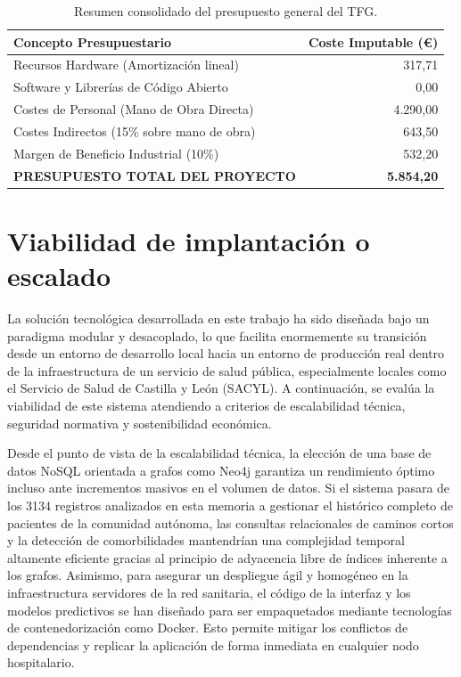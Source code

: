 \documentclass[12pt,a4paper,onecolumn,oneside]{report}
\begin{document}
\begin{table}[htbp]
\centering
\small
\begin{tabular}{|l|r|}
\hline
\textbf{Concepto Presupuestario} & \textbf{Coste Imputable (€)} \\ \hline
Recursos Hardware (Amortización lineal) & 317,71 \\ \hline
Software y Librerías de Código Abierto & 0,00 \\ \hline
Costes de Personal (Mano de Obra Directa) & 4.290,00 \\ \hline
Costes Indirectos (15\% sobre mano de obra) & 643,50 \\ \hline
Margen de Beneficio Industrial (10\%) & 532,20 \\ \hline
\textbf{PRESUPUESTO TOTAL DEL PROYECTO} & \textbf{5.854,20} \\ \hline
\end{tabular}
\caption{Resumen consolidado del presupuesto general del TFG.}
\label{tab:presupuesto_total}
\end{table}
\section{Viabilidad de implantación o escalado}

La solución tecnológica desarrollada en este trabajo ha sido diseñada bajo un paradigma modular y desacoplado, lo que facilita enormemente su transición desde un entorno de desarrollo local hacia un entorno de producción real dentro de la infraestructura de un servicio de salud pública, especialmente locales como el Servicio de Salud de Castilla y León (SACYL). A continuación, se evalúa la viabilidad de este sistema atendiendo a criterios de escalabilidad técnica, seguridad normativa y sostenibilidad económica.

Desde el punto de vista de la escalabilidad técnica, la elección de una base de datos NoSQL orientada a grafos como Neo4j garantiza un rendimiento óptimo incluso ante incrementos masivos en el volumen de datos. Si el sistema pasara de los 3134 registros analizados en esta memoria a gestionar el histórico completo de pacientes de la comunidad autónoma, las consultas relacionales de caminos cortos y la detección de comorbilidades mantendrían una complejidad temporal altamente eficiente gracias al principio de adyacencia libre de índices inherente a los grafos. Asimismo, para asegurar un despliegue ágil y homogéneo en la infraestructura servidores de la red sanitaria, el código de la interfaz y los modelos predictivos se han diseñado para ser empaquetados mediante tecnologías de contenedorización como Docker. Esto permite mitigar los conflictos de dependencias y replicar la aplicación de forma inmediata en cualquier nodo hospitalario.
\end{document}
